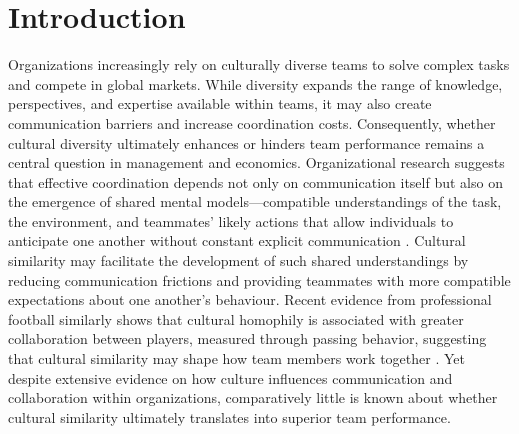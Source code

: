 \documentclass[10pt]{article}
\begin{document}
\section{Introduction}
Organizations increasingly rely on culturally diverse teams to solve complex tasks and compete in global markets. While diversity expands the range of knowledge, perspectives, and expertise available within teams, it may also create communication barriers and increase coordination costs. Consequently, whether cultural diversity ultimately enhances or hinders team performance remains a central question in management and economics. %
Organizational research suggests that effective coordination depends not only on communication itself but also on the emergence of shared mental models—compatible understandings of the task, the environment, and teammates’ likely actions that allow individuals to anticipate one another without constant explicit communication \citep{cannonbowers1993,klimoski1994,mathieu2000}. Cultural similarity may facilitate the development of such shared understandings by reducing communication frictions and providing teammates with more compatible expectations about one another’s behaviour. Recent evidence from professional football similarly shows that cultural homophily is associated with greater collaboration between players, measured through passing behavior, suggesting that cultural similarity may shape how team members work together \citep{bekesottaviano2025}. Yet despite extensive evidence on how culture influences communication and collaboration within organizations, comparatively little is known about whether cultural similarity ultimately translates into superior team performance.
\end{document}
